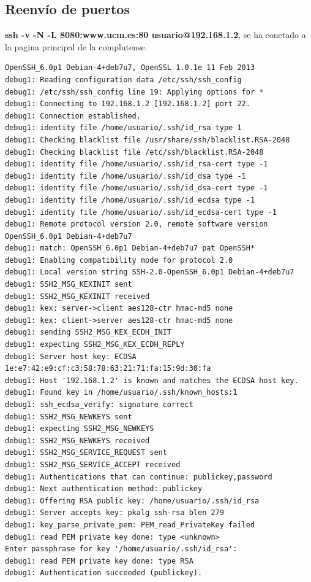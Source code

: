 \documentclass[11pt]{article}
\begin{document}
    \subsection{Reenvío de puertos}
      \par
      \textbf{ssh -v -N -L 8080:www.ucm.es:80 usuario@192.168.1.2}, se ha conetado a la pagina principal
      de la complutense.

\begin{lstlisting}
OpenSSH_6.0p1 Debian-4+deb7u7, OpenSSL 1.0.1e 11 Feb 2013
debug1: Reading configuration data /etc/ssh/ssh_config
debug1: /etc/ssh/ssh_config line 19: Applying options for *
debug1: Connecting to 192.168.1.2 [192.168.1.2] port 22.
debug1: Connection established.
debug1: identity file /home/usuario/.ssh/id_rsa type 1
debug1: Checking blacklist file /usr/share/ssh/blacklist.RSA-2048
debug1: Checking blacklist file /etc/ssh/blacklist.RSA-2048
debug1: identity file /home/usuario/.ssh/id_rsa-cert type -1
debug1: identity file /home/usuario/.ssh/id_dsa type -1
debug1: identity file /home/usuario/.ssh/id_dsa-cert type -1
debug1: identity file /home/usuario/.ssh/id_ecdsa type -1
debug1: identity file /home/usuario/.ssh/id_ecdsa-cert type -1
debug1: Remote protocol version 2.0, remote software version OpenSSH_6.0p1 Debian-4+deb7u7
debug1: match: OpenSSH_6.0p1 Debian-4+deb7u7 pat OpenSSH*
debug1: Enabling compatibility mode for protocol 2.0
debug1: Local version string SSH-2.0-OpenSSH_6.0p1 Debian-4+deb7u7
debug1: SSH2_MSG_KEXINIT sent
debug1: SSH2_MSG_KEXINIT received
debug1: kex: server->client aes128-ctr hmac-md5 none
debug1: kex: client->server aes128-ctr hmac-md5 none
debug1: sending SSH2_MSG_KEX_ECDH_INIT
debug1: expecting SSH2_MSG_KEX_ECDH_REPLY
debug1: Server host key: ECDSA 1e:e7:42:e9:cf:c3:58:78:63:21:71:fa:15:9d:30:fa
debug1: Host '192.168.1.2' is known and matches the ECDSA host key.
debug1: Found key in /home/usuario/.ssh/known_hosts:1
debug1: ssh_ecdsa_verify: signature correct
debug1: SSH2_MSG_NEWKEYS sent
debug1: expecting SSH2_MSG_NEWKEYS
debug1: SSH2_MSG_NEWKEYS received
debug1: SSH2_MSG_SERVICE_REQUEST sent
debug1: SSH2_MSG_SERVICE_ACCEPT received
debug1: Authentications that can continue: publickey,password
debug1: Next authentication method: publickey
debug1: Offering RSA public key: /home/usuario/.ssh/id_rsa
debug1: Server accepts key: pkalg ssh-rsa blen 279
debug1: key_parse_private_pem: PEM_read_PrivateKey failed
debug1: read PEM private key done: type <unknown>
Enter passphrase for key '/home/usuario/.ssh/id_rsa': 
debug1: read PEM private key done: type RSA
debug1: Authentication succeeded (publickey).

\end{lstlisting}
\end{document}
